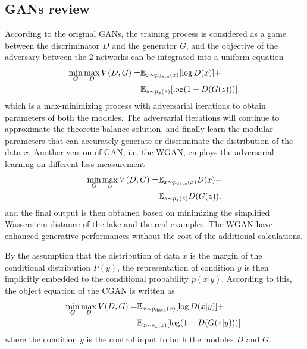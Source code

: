 \documentclass[publish,JACIII,paper]{jaciiiarticle}
\begin{document}
\subsection{GANs review}
According to the original GANs, the training process is considered as a game between the discriminator $D$ and the generator $G$,
and the objective of the adversary between the 2 networks can be integrated into a uniform equation
\begin{equation}
 \begin{aligned}
   \min\limits_{G}\max\limits_{D} V(D,G)=&\mathbb E_{x\sim p_{\rm data}(x)}[\log D(x)]+ \\
   &\mathbb E_{z\sim p_z(z)}[\log (1 - D(G(z)))].
\end{aligned}
\end{equation}
which is a max-minimizing process with adversarial iterations to obtain parameters of both the modules.  
The adversarial iterations will continue to approximate the theoretic balance solution,   
and finally learn the modular parameters that can accurately generate or discriminate the distribution of the data $x$. 
Another version of GAN, i.e. the WGAN, employs the adversarial learning on different loss measurement 
\begin{equation}
 \begin{aligned}
   \min\limits_{G}\max\limits_{D} V(D,G)=&\mathbb E_{x\sim p_{\rm data}(x)}D(x)- \\
   &\mathbb E_{z\sim p_z(z)}D(G(z)).
\end{aligned}
\end{equation}
and the final output is then obtained based on minimizing the simplified Wasserstein distance of the fake and the real examples. 
The WGAN have enhanced generative performances without the cost of the additional calculations.

By the assumption that the distribution of data $x$ is the margin of the conditional distribution $P(y)$, 
the representation of condition $y$ is then implicitly embedded to the conditional probability $p(x|y)$.
According to this, the object equation of the CGAN is written as 
\begin{equation}
 \begin{aligned}
   \min\limits_{G}\max\limits_{D} V(D,G)=&\mathbb E_{x\sim p_{\rm data}(x)}[\log D(x|y)]+ \\
   &\mathbb E_{z\sim p_z(z)}[\log (1 - D(G(z|y)))].
\end{aligned}
\end{equation}
where the condition $y$ is the control input to both the modules $D$ and $G$. 
\end{document}
